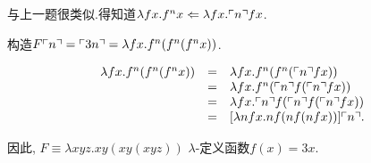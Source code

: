 
\begin{solution}
与上一题很类似.得知道$\lambda fx.f^n x \Leftarrow \lambda fx. \ulcorner{n}\urcorner fx$.

构造$F \ulcorner{n}\urcorner = \ulcorner{3n}\urcorner = \lambda fx. f^n (f^n (f^n x))$.

\[
 \begin{array}{rcl}
  \lambda fx. f^n (f^n (f^n x)) & = & \lambda fx. f^n (f^n (\ulcorner{n}\urcorner f x)) \\
  & = & \lambda fx. f^n (\ulcorner{n}\urcorner f (\ulcorner{n}\urcorner f x)) \\
  & = & \lambda fx. \ulcorner{n}\urcorner f (\ulcorner{n}\urcorner f (\ulcorner{n}\urcorner f x)) \\
  & = & [\lambda nfx. nf (nf (nfx))] \ulcorner{n}\urcorner.
 \end{array}
\]

因此, $F \equiv \lambda xyz. xy(xy(xyz))$ $\lambda$-定义函数$f(x)=3x$.
\end{solution}